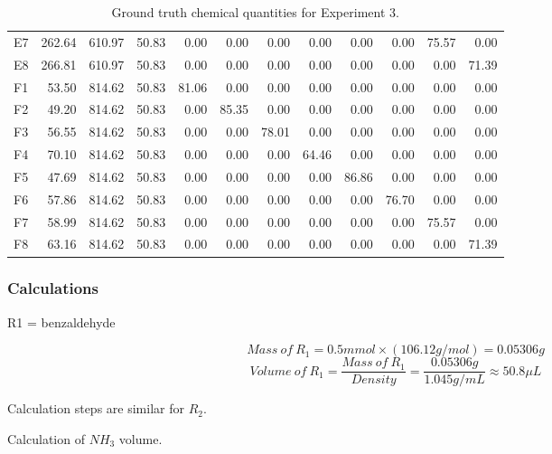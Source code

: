 \documentclass[sn-nature, twocolumn]{sn-jnl}%
\theoremstyle{thmstyleone}%
\theoremstyle{thmstyletwo}%
\theoremstyle{thmstylethree}%
\begin{document}
\begin{table}[!htb]
\begin{tabular}{lrrrrrrrrrrr}
E7 & 262.64 & 610.97 & 50.83 & 0.00 & 0.00 & 0.00 & 0.00 & 0.00 & 0.00 & 75.57 & 0.00 \\
E8 & 266.81 & 610.97 & 50.83 & 0.00 & 0.00 & 0.00 & 0.00 & 0.00 & 0.00 & 0.00 & 71.39 \\
F1 & 53.50 & 814.62 & 50.83 & 81.06 & 0.00 & 0.00 & 0.00 & 0.00 & 0.00 & 0.00 & 0.00 \\
F2 & 49.20 & 814.62 & 50.83 & 0.00 & 85.35 & 0.00 & 0.00 & 0.00 & 0.00 & 0.00 & 0.00 \\
F3 & 56.55 & 814.62 & 50.83 & 0.00 & 0.00 & 78.01 & 0.00 & 0.00 & 0.00 & 0.00 & 0.00 \\
F4 & 70.10 & 814.62 & 50.83 & 0.00 & 0.00 & 0.00 & 64.46 & 0.00 & 0.00 & 0.00 & 0.00 \\
F5 & 47.69 & 814.62 & 50.83 & 0.00 & 0.00 & 0.00 & 0.00 & 86.86 & 0.00 & 0.00 & 0.00 \\
F6 & 57.86 & 814.62 & 50.83 & 0.00 & 0.00 & 0.00 & 0.00 & 0.00 & 76.70 & 0.00 & 0.00 \\
F7 & 58.99 & 814.62 & 50.83 & 0.00 & 0.00 & 0.00 & 0.00 & 0.00 & 0.00 & 75.57 & 0.00 \\
F8 & 63.16 & 814.62 & 50.83 & 0.00 & 0.00 & 0.00 & 0.00 & 0.00 & 0.00 & 0.00 & 71.39 \\
\bottomrule
\end{tabular}
    \caption{Ground truth chemical quantities for Experiment 3.}
    \label{tab:placeholder}
\end{table}




\subsubsection*{Calculations}
R1 = benzaldehyde

\begin{equation*}
    Mass~of~R_{1}=0.5mmol×(106.12g/mol)=0.05306g
\end{equation*}
\begin{equation*}
    Volume~of~R_{1}= \frac{Mass~of~R_{1}}{Density} = \frac{0.05306g}{1.045g/mL} \approx 50.8  \mu L
\end{equation*}

Calculation steps are similar for $R_{2}$.

Calculation of $NH_{3}$ volume.
\end{document}
